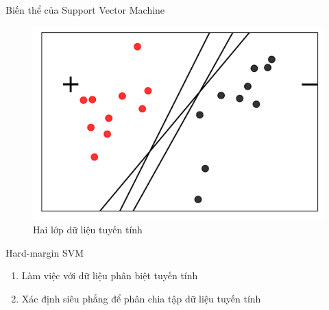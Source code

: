 \documentclass[
	10pt,                %
	aspectratio=169,     %
]{beamer}
\begin{document}
	\begin{frame}{Biến thể của Support Vector Machine}
	    
	    \begin{figure}[h!]
			\includegraphics[scale=0.5]{figures/svm1.png}
			\caption{Hai lớp dữ liệu tuyến tính}
		\end{figure}
		\begin{block}{Hard-margin SVM}
    	\begin{enumerate}
    		\item Làm việc với dữ liệu phân biệt tuyến tính
    		\item Xác định siêu phẳng để phân chia tập dữ liệu tuyến tính
    	\end{enumerate}
        \end{block}
        
	\end{frame}
\end{document}
